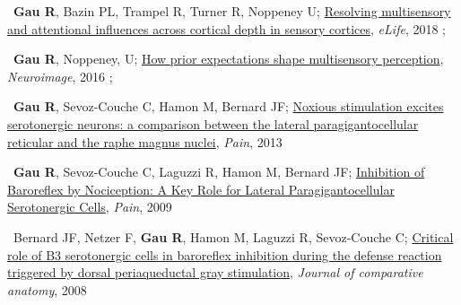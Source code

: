 \smallskip

\textbullet~\textbf{Gau R}, Bazin PL, Trampel R, Turner R, Noppeney U;
\href{https://osf.io/x3uak/}{Resolving multisensory and attentional influences across cortical depth in sensory cortices},
\textit{eLife},
2018
\newline
{};

\textbullet~\textbf{Gau R}, Noppeney, U;
\href{https://osf.io/8frkq/}{How prior expectations shape multisensory perception},
\textit{Neuroimage},
2016
\newline
{};

\textbullet~\textbf{Gau R}, Sevoz-Couche C, Hamon M, Bernard JF;
\href{https://osf.io/ktcv9/}{Noxious stimulation excites serotonergic neurons: a comparison between the lateral paragigantocellular reticular and the raphe magnus nuclei},
\textit{Pain},
2013
\newline
{}

\textbullet~\textbf{Gau R}, Sevoz-Couche C, Laguzzi R, Hamon M, Bernard JF;
\href{https://osf.io/cqhvb/}{Inhibition of Baroreflex by Nociception: A Key Role for Lateral Paragigantocellular Serotonergic Cells},
\textit{Pain},
2009
\newline
{}

\textbullet~Bernard JF, Netzer F, \textbf{Gau R}, Hamon M, Laguzzi R, Sevoz-Couche C;
\href{https://osf.io/rcvuj/}{Critical role of B3 serotonergic cells in baroreflex inhibition during the defense reaction triggered by dorsal periaqueductal gray stimulation},
\textit{Journal of comparative anatomy},
2008
\newline
{}
